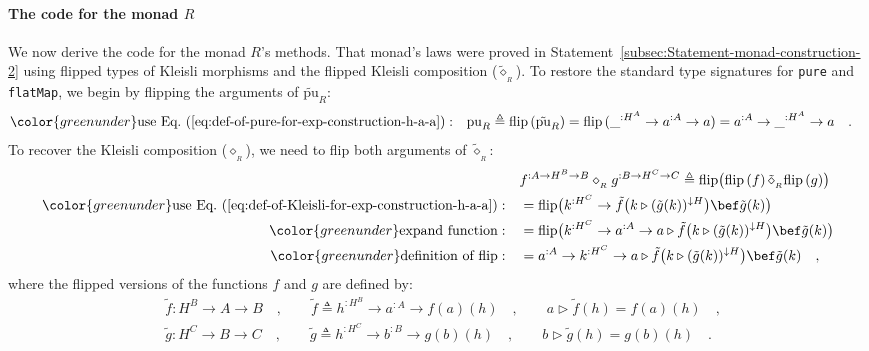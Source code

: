 \paragraph{The code for the monad $R$}

We now derive the code for the monad $R$\textsf{'}s methods. That monad\textsf{'}s
laws were proved in Statement~\ref{subsec:Statement-monad-construction-2}
using flipped types of Kleisli morphisms and the flipped Kleisli composition
($\tilde{\diamond}_{_{R}}$). To restore the standard type signatures
for \lstinline!pure! and \lstinline!flatMap!, we begin by flipping
the arguments of $\tilde{\text{pu}}_{R}$:
\begin{align*}
{\color{greenunder}\text{use Eq.~(\ref{eq:def-of-pure-for-exp-construction-h-a-a})}:}\quad & \text{pu}_{R}\triangleq\text{flip}\,(\tilde{\text{pu}}_{R})=\text{flip}\,(\_^{:H^{A}}\rightarrow a^{:A}\rightarrow a)=a^{:A}\rightarrow\_^{:H^{A}}\rightarrow a\quad.
\end{align*}
To recover the Kleisli composition ($\diamond_{_{R}}$), we need to
flip both arguments of $\tilde{\diamond}_{_{R}}$:
\begin{align*}
 & f^{:A\rightarrow H^{B}\rightarrow B}\diamond_{_{R}}g^{:B\rightarrow H^{C}\rightarrow C}\triangleq\text{flip}\big(\text{flip}\,(f)\,\tilde{\diamond}_{_{R}}\text{flip}\,(g)\big)\\
{\color{greenunder}\text{use Eq.~(\ref{eq:def-of-Kleisli-for-exp-construction-h-a-a})}:}\quad & =\text{flip}\big(k^{:H^{C}}\rightarrow\tilde{f}\big(k\triangleright(\tilde{g}(k))^{\downarrow H}\big)\bef\tilde{g}(k)\big)\\
{\color{greenunder}\text{expand function}:}\quad & =\text{flip}\big(k^{:H^{C}}\rightarrow a^{:A}\rightarrow a\triangleright\tilde{f}\big(k\triangleright(\tilde{g}(k))^{\downarrow H}\big)\bef\tilde{g}(k)\big)\\
{\color{greenunder}\text{definition of }\text{flip}:}\quad & =a^{:A}\rightarrow k^{:H^{C}}\rightarrow a\triangleright\tilde{f}\big(k\triangleright(\tilde{g}(k))^{\downarrow H}\big)\bef\tilde{g}(k)\quad,
\end{align*}
where the flipped versions of the functions $f$ and $g$ are defined
by:
\begin{align*}
 & \tilde{f}:H^{B}\rightarrow A\rightarrow B\quad,\quad\quad\tilde{f}\triangleq h^{:H^{B}}\rightarrow a^{:A}\rightarrow f(a)(h)\quad,\quad\quad a\triangleright\tilde{f}(h)=f(a)(h)\quad,\\
 & \tilde{g}:H^{C}\rightarrow B\rightarrow C\quad,\quad\quad\tilde{g}\triangleq h^{:H^{C}}\rightarrow b^{:B}\rightarrow g(b)(h)\quad,\quad\quad b\triangleright\tilde{g}(h)=g(b)(h)\quad.
\end{align*}
